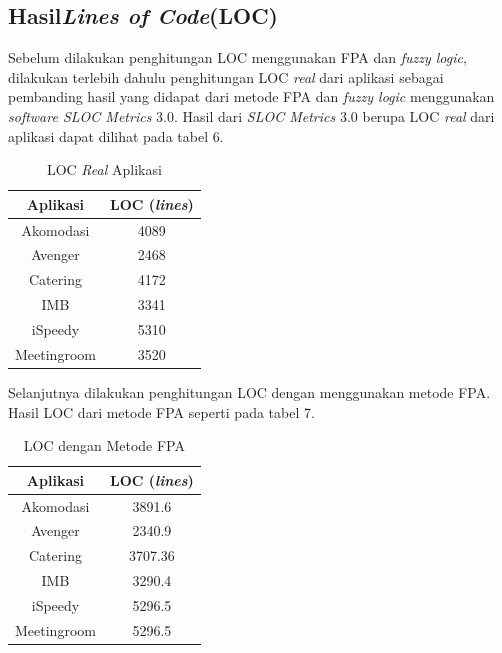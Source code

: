 \documentclass[a4paper]{article}
\begin{document}
\begin{multicols}{2}
\subsection{Hasil\textit{Lines of Code}(LOC)}

\par Sebelum dilakukan penghitungan LOC menggunakan FPA dan \textit{fuzzy logic}, dilakukan terlebih dahulu penghitungan LOC \textit{real} dari aplikasi sebagai pembanding hasil yang didapat dari metode FPA dan \textit{fuzzy logic} menggunakan \textit{software SLOC Metrics} 3.0. Hasil dari \textit{SLOC Metrics} 3.0 berupa LOC\textit{ real} dari aplikasi dapat dilihat pada tabel 6.

\begin{table}[H]
    \centering
    \caption{LOC \textit{Real} Aplikasi}
    \bigskip
    \begin{tabular}{|c|c|}
        \hline
        \textbf{Aplikasi} & \textbf{LOC (\textit{lines})}\\
        \hline
        Akomodasi & 4089\\
        Avenger & 2468\\
        Catering & 4172\\
        IMB & 3341\\
        iSpeedy & 5310\\
        Meetingroom & 3520\\
        \hline
    \end{tabular}
    \label{tab6}
\end{table}

\par Selanjutnya dilakukan penghitungan LOC dengan menggunakan metode FPA. Hasil LOC dari metode FPA seperti pada tabel 7.

\begin{table}[H]
    \centering
    \caption{LOC dengan Metode FPA}
    \bigskip
    \begin{tabular}{|c|c|}
        \hline
        \textbf{Aplikasi} & \textbf{LOC (\textit{lines})}\\
        \hline
        Akomodasi & 3891.6\\
        Avenger & 2340.9\\
        Catering & 3707.36\\
        IMB & 3290.4\\
        iSpeedy & 5296.5\\
        Meetingroom &  5296.5\\
        \hline
    \end{tabular}
    \label{tab7}
\end{table}


\end{multicols}
\end{document}
